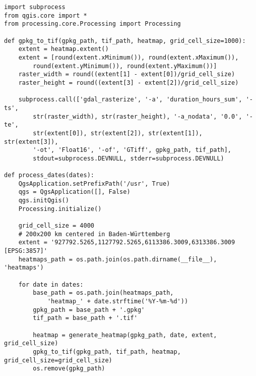 \clearpage
\begin{minipage}{\textwidth}
\begin{code}
\begin{verbatim}
import subprocess
from qgis.core import *
from processing.core.Processing import Processing

def gpkg_to_tif(gpkg_path, tif_path, heatmap, grid_cell_size=1000):
    extent = heatmap.extent()
    extent = [round(extent.xMinimum()), round(extent.xMaximum()),
        round(extent.yMinimum()), round(extent.yMaximum())]
    raster_width = round((extent[1] - extent[0])/grid_cell_size)
    raster_height = round((extent[3] - extent[2])/grid_cell_size)

    subprocess.call(['gdal_rasterize', '-a', 'duration_hours_sum', '-ts',
        str(raster_width), str(raster_height), '-a_nodata', '0.0', '-te',
        str(extent[0]), str(extent[2]), str(extent[1]), str(extent[3]),
        '-ot', 'Float16', '-of', 'GTiff', gpkg_path, tif_path],
        stdout=subprocess.DEVNULL, stderr=subprocess.DEVNULL)

def process_dates(dates):
    QgsApplication.setPrefixPath('/usr', True)
    qgs = QgsApplication([], False)
    qgs.initQgis()
    Processing.initialize()

    grid_cell_size = 4000
    # 200x200 km centered in Baden-Württemberg
    extent = '927792.5265,1127792.5265,6113386.3009,6313386.3009 [EPSG:3857]'
    heatmaps_path = os.path.join(os.path.dirname(__file__), 'heatmaps')

    for date in dates:
        base_path = os.path.join(heatmaps_path,
            'heatmap_' + date.strftime('%Y-%m-%d'))
        gpkg_path = base_path + '.gpkg'
        tif_path = base_path + '.tif'

        heatmap = generate_heatmap(gpkg_path, date, extent, grid_cell_size)
        gpkg_to_tif(gpkg_path, tif_path, heatmap, grid_cell_size=grid_cell_size)
        os.remove(gpkg_path)
\end{verbatim}
\label{lst:ProcessDatesFunction}
\end{code}
\end{minipage}

